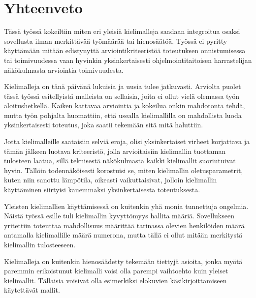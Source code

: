 \chapter{Yhteenveto}
\label{ch:yhteenveto}

Tässä työssä kokeiltiin miten eri yleisiä kielimalleja saadaan integroitua
osaksi sovellusta ilman merkittävää työmäärää tai hienosäätöä. Työssä ei
pyritty käyttämään mitään edistynyttä arviointikriteeristöä toteutuksen
onnistumisessa tai toimivuudessa vaan hyvinkin yksinkertaisesti
ohjelmointitaitoisen harrastelijan näkökulmasta arviointia toimivuudesta.

Kielimalleja on tänä päivänä lukuisia ja uusia tulee jatkuvasti. Arviolta
puolet tässä työssä esitellyistä malleista on sellaisia, joita ei ollut vielä
olemassa työn aloitushetkellä. Kaiken kattavaa arviointia ja kokeilua onkin
mahdotonta tehdä, mutta työn pohjalta huomattiin, että usealla kielimallilla
on mahdollista luoda yksinkertaisesti toteutus, joka saatii tekemään sitä mitä
haluttiin.

Jotta kielimalleille saataisiin selviä eroja, olisi yksinkertaiset virheet
korjattava ja tämän jälkeen luotava kriteeristö, jolla arvioitaisiin
kielimallin tuottaman tulosteen laatua, sillä teknisestä näkökulmasta
kaikki kielimallit suoriutuivat hyvin. Tällöin todennäköisesti korostuisi se,
miten kielimallin oletusparametrit, kuten niin sanottu lämpötila, oikeasti
vaikuttaisivat, jolloin kielimallin käyttäminen siirtyisi kauemmaksi
yksinkertaisesta toteutuksesta.

Yleisten kielimallien käyttämisessä on kuitenkin yhä monia tunnettuja ongelmia.
Näistä työssä esille tuli kielimallin kyvyttömyys hallita määriä. Sovellukseen
yritettiin toteuttaa mahdollisuus määrittää tarinassa olevien henkilöiden määrä
antamalla kielimallille määrä numerona, mutta tällä ei ollut mitään merkitystä
kielimallin tulosteeseen.

Kielimalleja on kuitenkin hienosäädetty tekemään tiettyjä asioita, jonka myötä
paremmin erikoistunut kielimalli voisi olla parempi vaihtoehto kuin yleiset
kielimallit. Tällaisia voisivat olla esimerkiksi elokuvien käsikirjoittamiseen
käytettävät mallit.
